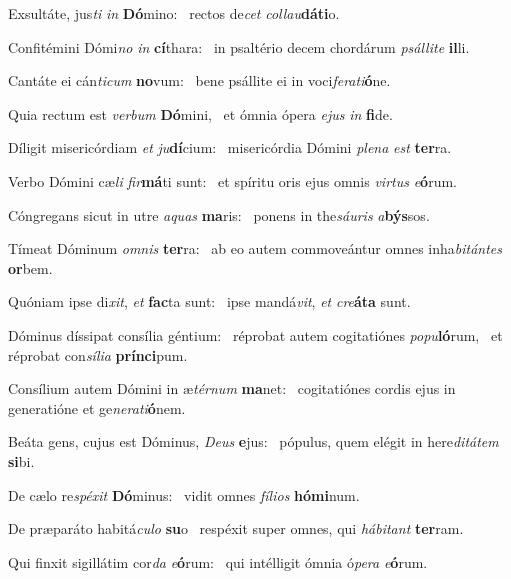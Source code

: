 \item Exsultáte, jus\textit{ti} \textit{in} \textbf{Dó}mino:~\psstar{} rectos de\textit{cet} \textit{collau}\textbf{dá}\textbf{ti}o.
\item Confitémini Dómi\textit{no} \textit{in} \textbf{cí}thara:~\psstar{} in psaltério decem chordárum \textit{psállite} \textbf{il}li.
\item Cantáte ei cán\textit{ticum} \textbf{no}vum:~\psstar{} bene psállite ei in voci\textit{ferati}\textbf{ó}ne.
\item Quia rectum est \textit{verbum} \textbf{Dó}mini,~\psstar{} et ómnia ópera \textit{ejus} \textit{in} \textbf{fi}de.
\item Díligit misericórdiam \textit{et} \textit{ju}\textbf{dí}cium:~\psstar{} misericórdia Dómini \textit{plena} \textit{est} \textbf{ter}ra.
\item Verbo Dómini cæ\textit{li} \textit{fir}\textbf{má}ti sunt:~\psstar{} et spíritu oris ejus omnis \textit{virtus} \textit{e}\textbf{ó}rum.
\item Cóngregans sicut in utre \textit{aquas} \textbf{ma}ris:~\psstar{} ponens in the\textit{sáuris} \textit{a}\textbf{býs}sos.
\item Tímeat Dóminum \textit{omnis} \textbf{ter}ra:~\psstar{} ab eo autem commoveántur omnes inha\textit{bitántes} \textbf{or}bem.
\item Quóniam ipse di\textit{xit}, \textit{et} \textbf{fac}ta sunt:~\psstar{} ipse mandá\textit{vit}, \textit{et} \textit{cre}\textbf{á}\textbf{ta} sunt.
\item Dóminus díssipat consília géntium:~\pscross{} réprobat autem cogitatiónes \textit{popu}\textbf{ló}rum,~\psstar{} et réprobat con\textit{sília} \textbf{prín}\textbf{ci}pum.
\item Consílium autem Dómini in æ\textit{térnum} \textbf{ma}net:~\psstar{} cogitatiónes cordis ejus in generatióne et ge\textit{nerati}\textbf{ó}nem.
\item Beáta gens, cujus est Dóminus, \textit{Deus} \textbf{e}jus:~\psstar{} pópulus, quem elégit in here\textit{ditátem} \textbf{si}bi.
\item De cælo re\textit{spéxit} \textbf{Dó}minus:~\psstar{} vidit omnes \textit{fílios} \textbf{hó}\textbf{mi}num.
\item De præparáto habitá\textit{culo} \textbf{su}o~\psstar{} respéxit super omnes, qui \textit{hábitant} \textbf{ter}ram.
\item Qui finxit sigillátim cor\textit{da} \textit{e}\textbf{ó}rum:~\psstar{} qui intélligit ómnia ó\textit{pera} \textit{e}\textbf{ó}rum.
